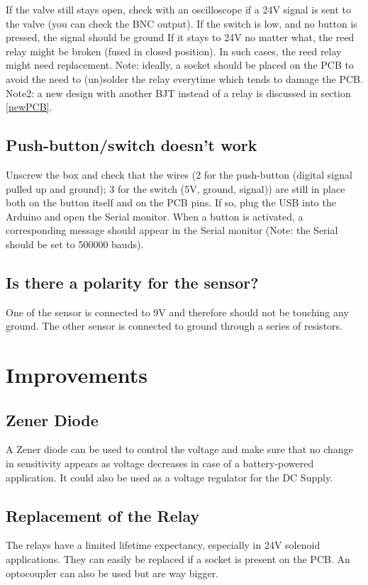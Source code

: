 \documentclass[a4paper]{article}
\begin{document}
If the valve still stays open, check with an oscilloscope if a 24V signal is sent to the valve (you can check the BNC output). If the switch is low, and no button is pressed, the signal should be ground If it stays to 24V no matter what, the reed relay might be broken (fused in closed position). In such cases, the reed relay might need replacement.
Note: ideally, a socket should be placed on the PCB to avoid the need to (un)solder the relay everytime which tends to damage the PCB.
Note2: a new design with another BJT instead of a relay is discussed in section \ref{newPCB}.

\subsection{Push-button/switch doesn't work}
Unscrew the box and check that the wires (2 for the push-button (digital signal pulled up and ground); 3 for the switch (5V, ground, signal)) are still in place both on the button itself and on the PCB pins.
If so, plug the USB into the Arduino and open the Serial monitor. When a button is activated, a corresponding message should appear in the Serial monitor (Note: the Serial should be set to 500000 bauds).

\subsection{Is there a polarity for the sensor?}
One of the sensor is connected to 9V and therefore should not be touching any ground. 
The other sensor is connected to ground through a series of resistors.

\section{Improvements}
\subsection{Zener Diode}
A Zener diode can be used to control the voltage and make sure that no change in sensitivity appears as voltage decreases in case of a battery-powered application. It could also be used as a voltage regulator for the DC Supply.

\subsection{Replacement of the Relay}
The relays have a limited lifetime expectancy, especially in 24V solenoid applications. They can easily be replaced if a socket is present on the PCB. An optocoupler can also be used but are way bigger. 
\end{document}
